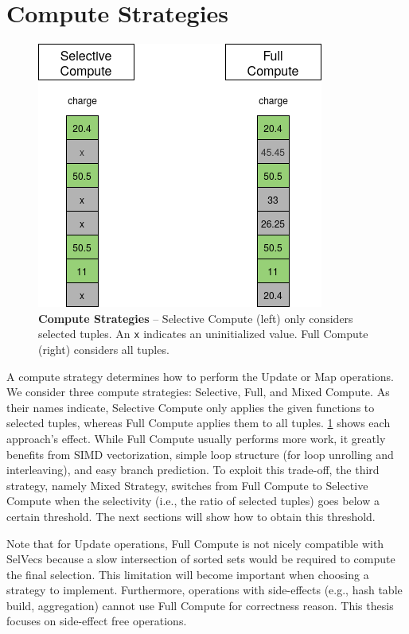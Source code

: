 \documentclass[12pt]{cmuthesis}
\begin{document}
\section{Compute Strategies}
\begin{figure}[t!]
    \centering
    \includegraphics[scale=0.5]{images/ComputeIntro.png}
    \caption{\textbf{Compute Strategies} -- Selective Compute (left) only considers selected tuples. An \texttt{x} indicates an uninitialized value. Full Compute (right) considers all tuples.}
    \label{fig:compute_intro}
\end{figure}
 A compute strategy determines how to perform the Update or Map operations. We consider three compute strategies: Selective, Full, and Mixed Compute. As their names indicate, Selective Compute only applies the given functions to selected tuples, whereas Full Compute applies them to all tuples. \cref{fig:compute_intro} shows each approach's effect. While Full Compute usually performs more work, it greatly benefits from SIMD vectorization, simple loop structure (for loop unrolling and interleaving), and easy branch prediction. To exploit this trade-off, the third strategy, namely Mixed Strategy, switches from Full Compute to Selective Compute when the selectivity (i.e., the ratio of selected tuples) goes below a certain threshold. The next sections will show how to obtain this threshold.
 
Note that for Update operations, Full Compute is not nicely compatible with SelVecs because a slow intersection of sorted sets \cite{sorted_set} would be required to compute the final selection. This limitation will become important when choosing a strategy to implement. Furthermore, operations with side-effects (e.g., hash table build, aggregation) cannot use Full Compute for correctness reason. This thesis focuses on side-effect free operations.
\end{document}
